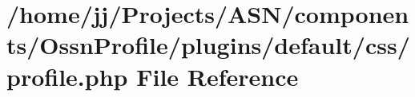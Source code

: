 \hypertarget{_ossn_profile_2plugins_2default_2css_2profile_8php}{}\section{/home/jj/\+Projects/\+A\+S\+N/components/\+Ossn\+Profile/plugins/default/css/profile.php File Reference}
\label{_ossn_profile_2plugins_2default_2css_2profile_8php}
